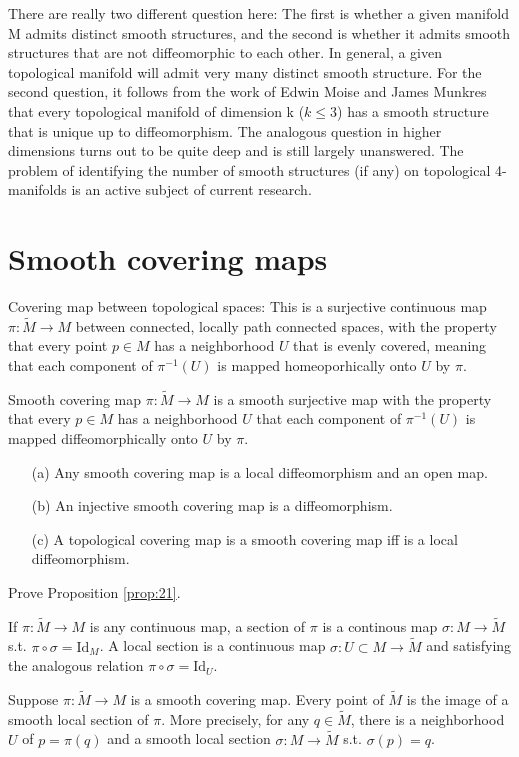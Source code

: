 There are really two different question here: The first is whether a given manifold M admits distinct
smooth structures, and the second is whether it admits smooth structures that are not diffeomorphic to
each other. In general, a given topological manifold will admit very many distinct smooth structure.
For the second question, it  follows from the work of Edwin Moise and James Munkres that every topological
manifold of dimension k ($k\leqslant 3$) has a smooth structure that is unique up to diffeomorphism.
The analogous question in higher dimensions turns out to be quite deep and is still largely unanswered.
The problem of identifying the number of smooth structures (if any) on topological 4-manifolds is an
active subject of current research.
\section{Smooth covering maps}
\begin{definition}
Covering map between topological spaces: This is a surjective continuous map $\pi:\tilde{M}\rightarrow M$
between connected, locally path connected spaces, with the property that every point $p\in M$ has a 
neighborhood $U$ that is evenly covered, meaning that each component of $\pi^{-1}(U)$ is mapped 
homeoporhically onto $U$ by $\pi$.
\end{definition}
\begin{definition}
Smooth covering map $\pi:\tilde{M}\rightarrow M$ is a smooth surjective map with the property that every
$p\in M$ has a neighborhood $U$ that each component of $\pi^{-1}(U)$ is mapped diffeomorphically onto 
$U$ by $\pi$.
\end{definition}
\begin{prop}\label{prop:21}
\begin{enumerate}
\item[(a)] Any smooth covering map is a local diffeomorphism and an open map.
\item[(b)] An injective smooth covering map is a diffeomorphism.
\item[(c)] A topological covering map is a smooth covering map iff is a local diffeomorphism.
\end{enumerate}
\end{prop}
\begin{exer}
Prove Proposition \ref{prop:21}.
\end{exer}
If $\pi:\tilde{M}\rightarrow M$ is any continuous map, a section of $\pi$ is a continous map $\sigma:M
\rightarrow\tilde{M}$ s.t. $\pi\circ\sigma=\mathrm{Id}_M$. A local section is a continuous map $\sigma:
U\subset M\rightarrow\tilde{M}$ and satisfying the analogous relation $\pi\circ\sigma=\mathrm{Id}_U$.
\begin{lem}
Suppose $\pi:\tilde{M}\rightarrow M$ is a smooth covering map. Every point of $\tilde{M}$ is the image
of a smooth local section of $\pi$. More precisely, for any $q\in \tilde{M}$, there is a neighborhood 
$U$ of $p=\pi(q)$ and a smooth local section $\sigma:M\rightarrow\tilde{M}$ s.t. $\sigma(p)=q$.
\end{lem}
